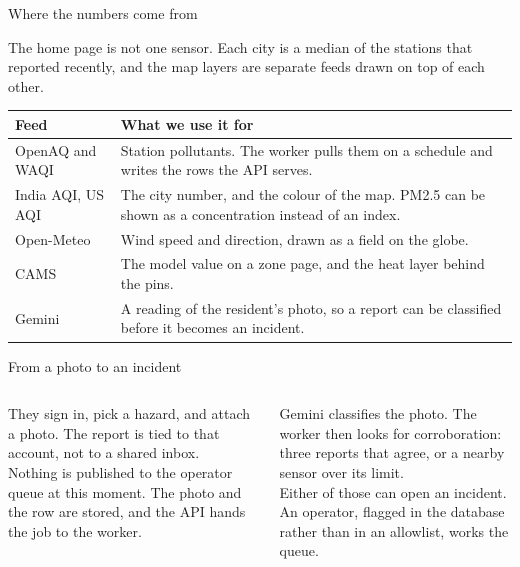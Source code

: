 \documentclass[t,aspectratio=169]{beamer}
\begin{document}
\begin{frame}[c]{Where the numbers come from}
  \begin{minipage}{\textwidth}
    \footnotesize The home page is not one sensor. Each city is a median of the stations that reported recently, and the map layers are separate feeds drawn on top of each other.
  \end{minipage}\par\vspace{0.3cm}
  \footnotesize
  \renewcommand{\arraystretch}{1.16}
  \begin{tabularx}{\textwidth}{@{}H Y@{}}
    \toprule
    \textcolor{nlNavy}{\textbf{Feed}} & \textbf{What we use it for} \\
    \midrule
    OpenAQ and WAQI & Station pollutants. The worker pulls them on a schedule and writes the rows the API serves. \\
    India AQI, US AQI & The city number, and the colour of the map. PM2.5 can be shown as a concentration instead of an index. \\
    Open-Meteo & Wind speed and direction, drawn as a field on the globe. \\
    CAMS & The model value on a zone page, and the heat layer behind the pins. \\
    Gemini & A reading of the resident's photo, so a report can be classified before it becomes an incident. \\
    \bottomrule
  \end{tabularx}
\end{frame}

\begin{frame}[c]{From a photo to an incident}
  \begin{columns}[T,totalwidth=\textwidth]
    \begin{column}{0.48\textwidth}
      \begin{eqcard}{4.7cm}
        They sign in, pick a hazard, and attach a photo. The report is tied to that account, not to a shared inbox.\\[0.45em]
        Nothing is published to the operator queue at this moment. The photo and the row are stored, and the API hands the job to the worker.
      \end{eqcard}
    \end{column}
    \hfill
    \begin{column}{0.48\textwidth}
      \begin{eqcard}{4.7cm}
        Gemini classifies the photo. The worker then looks for corroboration: three reports that agree, or a nearby sensor over its limit.\\[0.45em]
        Either of those can open an incident. An operator, flagged in the database rather than in an allowlist, works the queue.
      \end{eqcard}
    \end{column}
  \end{columns}
\end{frame}
\end{document}
